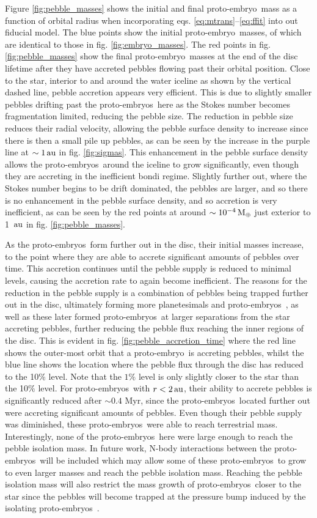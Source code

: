 \documentclass[a4paper,fleqn,usenatbib]{mnras}
\newcommand{\me}{{\, {\rm M}_{\oplus}}}
\newcommand{\au}{{\, {\rm au}}}
\newcommand{\emb}{{{proto-embryo~}}}
\newcommand{\embs}{{{proto-embryos~}}}
\begin{document}
Figure \ref{fig:pebble_masses} shows the initial and final \emb mass as a function of orbital radius when incorporating eqs. \ref{eq:mtrans}--\ref{eq:ffit} into out fiducial model.
The blue points show the initial \emb masses, of which are identical to those in fig. \ref{fig:embryo_masses}.
The red points in fig. \ref{fig:pebble_masses} show the final \emb masses at the end of the disc lifetime after they have accreted pebbles flowing past their orbital position.
Close to the star, interior to and around the water iceline as shown by the vertical dashed line, pebble accretion appears very efficient.
This is due to slightly smaller pebbles drifting past the \embs here as the Stokes number becomes fragmentation limited, reducing the pebble size.
The reduction in pebble size reduces their radial velocity, allowing the pebble surface density to increase since there is then a small pile up pebbles, as can be seen by the increase in the purple line at $\sim 1\au$ in fig. \ref{fig:sigmas}.
This enhancement in the pebble surface density allows the \embs around the iceline to grow significantly, even though they are accreting in the inefficient bondi regime.
Slightly further out, where the Stokes number begins to be drift dominated, the pebbles are larger, and so there is no enhancement in the pebble surface density, and so accretion is very inefficient, as can be seen by the red points at around $\sim 10^{-4} \me$ just exterior to 1 $\au$ in fig. \ref{fig:pebble_masses}.

As the \embs form further out in the disc, their initial masses increase, to the point where they are able to accrete significant amounts of pebbles over time.
This accretion continues until the pebble supply is reduced to minimal levels, causing the accretion rate to again become inefficient. 
The reasons for the reduction in the pebble supply is a combination of  pebbles being trapped further out in the disc, ultimately forming more planetesimals and \embs, as well as these later formed \embs at larger separations from the star accreting pebbles, further reducing the pebble flux reaching the inner regions of the disc.
This is evident in fig. \ref{fig:pebble_accretion_time} where the red line shows the outer-most orbit that a \emb is accreting pebbles, whilst the blue line shows the location where the pebble flux through the disc has reduced to the 10$\%$ level.
Note that the $1\%$ level is only slightly closer to the star than the 10$\%$ level.
For \embs with $r< 2\au$, their ability to accrete pebbles is significantly reduced after $\sim0.4$ Myr, since the \embs located further out were accreting significant amounts of pebbles.
Even though their pebble supply was diminished, these \embs were able to reach terrestrial mass.
Interestingly, none of the \embs here were large enough to reach the pebble isolation mass.
In future work, N-body interactions between the \embs will be included which may allow some of these \embs to grow to even larger masses and reach the pebble isolation mass.
Reaching the pebble isolation mass will also restrict the mass growth of \embs closer to the star since the pebbles will become trapped at the pressure bump induced by the isolating \embs.
\end{document}
